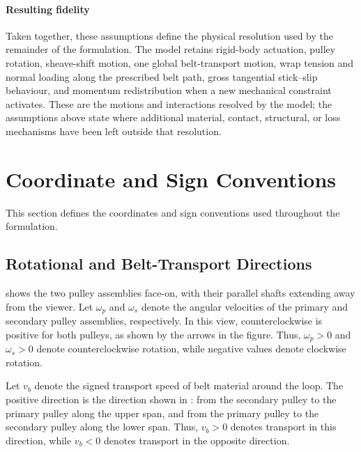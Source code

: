 \documentclass[11pt]{report}
\numberwithin{equation}{section}
\newcounter{assump}
\begin{document}
\paragraph{Resulting fidelity}
Taken together, these assumptions define the physical resolution used by the
remainder of the formulation. The model retains rigid-body actuation, pulley
rotation, sheave-shift motion, one global belt-transport motion, wrap tension
and normal loading along the prescribed belt path, gross tangential
stick--slip behaviour, and momentum redistribution when a new mechanical
constraint activates. These are the motions and interactions resolved by the
model; the assumptions above state where additional material, contact,
structural, or loss mechanisms have been left outside that resolution.

\section{Coordinate and Sign Conventions}
\label{sec:coordinate_sign_conventions}

This section defines the coordinates and sign conventions used throughout the
formulation.

\subsection{Rotational and Belt-Transport Directions}
\label{sec:rotational_sign}

 shows the two pulley assemblies face-on, with their
parallel shafts extending away from the viewer. Let \(\omega_p\) and
\(\omega_s\) denote the angular velocities of the primary and secondary pulley
assemblies, respectively. In this view, counterclockwise is positive for both
pulleys, as shown by the arrows in the figure. Thus, \(\omega_p>0\) and
\(\omega_s>0\) denote counterclockwise rotation, while negative values denote
clockwise rotation.

Let \(v_b\) denote the signed transport speed of belt material around the
loop. The positive direction is the direction shown in
: from the secondary pulley to the primary pulley
along the upper span, and from the primary pulley to the secondary pulley
along the lower span. Thus, \(v_b>0\) denotes transport in this direction,
while \(v_b<0\) denotes transport in the opposite direction.
\end{document}
